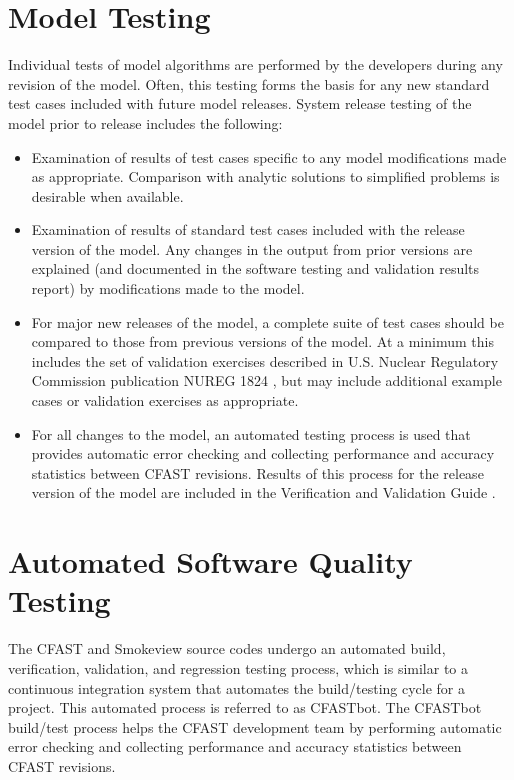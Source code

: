 \documentclass[12pt]{book}
\begin{document}
\section{Model Testing}

Individual tests of model algorithms are performed by the developers during any revision of the model. Often, this testing forms the basis for any new standard test cases included with future model releases. System release testing of the model prior to release includes the following:

\begin{itemize}
    \item Examination of results of test cases specific to any model modifications made as appropriate.  Comparison with analytic solutions to simplified problems is desirable when available.
    
    \item Examination of results of standard test cases included with the release version of the model. Any changes in the output from prior versions are explained (and documented in the software testing and validation results report) by modifications made to the model.
    
    \item For major new releases of the model, a complete suite of test cases should be compared to those from previous versions of the model.  At a minimum this includes the set of validation exercises described in U.S. Nuclear Regulatory Commission publication NUREG 1824 \cite{NRCNUREG1824}, but may include additional example cases or validation exercises as appropriate.
    
    \item For all changes to the model, an automated testing process is used that provides automatic error checking and collecting performance and accuracy statistics between CFAST revisions. Results of this process for the release version of the model are included in the Verification and Validation Guide \cite{CFAST_Valid_Guide_8}.
\end{itemize}

\section{Automated Software Quality Testing}

The CFAST and Smokeview source codes undergo an automated build, verification, validation, and regression testing process, which is similar to a continuous integration system that automates the build/testing cycle for a project. This automated process is referred to as CFASTbot. The CFASTbot build/test process helps the CFAST development team by performing automatic error checking and collecting performance and accuracy statistics between CFAST revisions.
\end{document}
